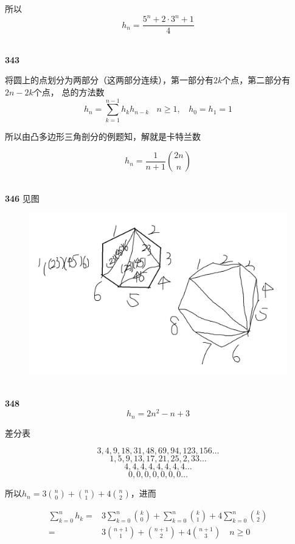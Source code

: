 \documentclass[UTF8]{ctexart}
\begin{document}
    所以$$\displaystyle h_n = \frac{5^n+2\cdot 3^n+1}{4}$$

    ~\\
    \noindent\textbf{343}

    将圆上的点划分为两部分（这两部分连续），第一部分有$2k$个点，第二部分有$2n-2k$个点，
    总的方法数$$h_n=\sum_{k=1}^{n-1}h_{k}h_{n-k}~~~~n\ge 1,~~~~h_0=h_1=1$$

    所以由凸多边形三角剖分的例题知，解就是卡特兰数

    $$h_n = \frac{1}{n+1} \binom{2n}{n}$$


    ~\\
    \noindent\textbf{346}
    见图
    \begin{figure}[h]
        \includegraphics[width=1\linewidth]{1.png}
    \end{figure}

    ~\\
    \noindent\textbf{348}
    $$h_n = 2n^2 -n + 3$$

    差分表

    $$3, 4, 9, 18, 31, 48, 69, 94, 123, 156\dots$$
    $$ 1, 5, 9, 13, 17, 21, 25, 2, 33\dots$$
    $$4, 4, 4, 4, 4, 4, 4, 4\dots$$
    $$ 0, 0, 0, 0, 0, 0, 0\dots$$

    所以$h_n = 3 \binom{n}{0} + \binom{n}{1} + 4 \binom{n}{2}$，进而

    \begin{equation*}
        \begin{aligned}
            \sum_{k=0}^{n} h_k =& 3 \sum_{k=0}^{n} \binom{k}{0} + \sum_{k=0}^{n} \binom{k}{1} + 4 \sum_{k=0}^{n} \binom{k}{2} \\
            =& 3 \binom{n+1}{1} + \binom{n+1}{2} + 4 \binom{n+1}{3} \quad n \ge 0
        \end{aligned}
    \end{equation*}
\end{document}
